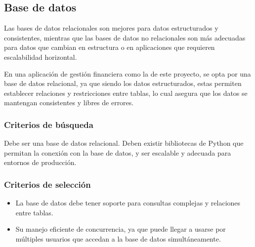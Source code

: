 \subsection{Base de datos}
Las bases de datos relacionales son mejores para datos estructurados y consistentes, mientras que las bases de datos no relacionales son más adecuadas para datos que cambian en estructura o en aplicaciones que requieren escalabilidad horizontal. 

En una aplicación de gestión financiera como la de este proyecto, se opta por una base de datos relacional, ya que siendo los datos estructurados, estas permiten establecer relaciones y restricciones entre tablas, lo cual asegura que los datos se mantengan consistentes y libres de errores.

\subsubsection{Criterios de búsqueda}
Debe ser una base de datos relacional. Deben existir bibliotecas de Python que permitan la conexión con la base de datos, y ser escalable y adecuada para entornos de producción.



\subsubsection{Criterios de selección}
\begin{itemize}
    \item La base de datos debe tener soporte para consultas complejas y relaciones entre tablas. 
    \item Su manejo eficiente de concurrencia, ya que puede llegar a usarse por múltiples usuarios que accedan a la base de datos simultáneamente.
\end{itemize}


